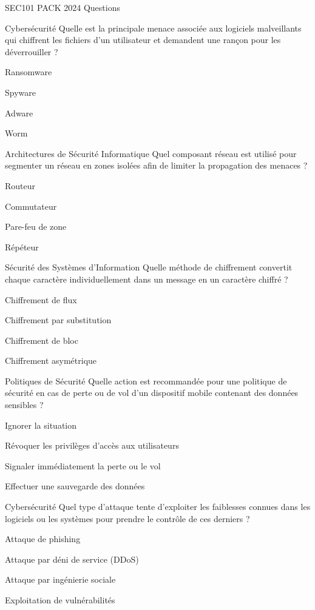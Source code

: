 \documentclass[12pt]{article}
\begin{document}
\begin{quiz}{SEC101 PACK 2024 Questions}
  \begin{multi}[points=1]{Cybersécurité}
    Quelle est la principale menace associée aux logiciels malveillants qui chiffrent les fichiers d'un utilisateur et demandent une rançon pour les déverrouiller ?
    \item* Ransomware
    \item Spyware
    \item Adware
    \item Worm
  \end{multi}

  \begin{multi}[points=1]{Architectures de Sécurité Informatique}
    Quel composant réseau est utilisé pour segmenter un réseau en zones isolées afin de limiter la propagation des menaces ?
    \item Routeur
    \item Commutateur
    \item* Pare-feu de zone
    \item Répéteur
  \end{multi}

  \begin{multi}[points=1]{Sécurité des Systèmes d'Information}
    Quelle méthode de chiffrement convertit chaque caractère individuellement dans un message en un caractère chiffré ?
    \item Chiffrement de flux
    \item* Chiffrement par substitution
    \item Chiffrement de bloc
    \item Chiffrement asymétrique
  \end{multi}

  \begin{multi}[points=1]{Politiques de Sécurité}
    Quelle action est recommandée pour une politique de sécurité en cas de perte ou de vol d'un dispositif mobile contenant des données sensibles ?
    \item Ignorer la situation
    \item Révoquer les privilèges d'accès aux utilisateurs
    \item* Signaler immédiatement la perte ou le vol
    \item Effectuer une sauvegarde des données
  \end{multi}

  \begin{multi}[points=1]{Cybersécurité}
    Quel type d'attaque tente d'exploiter les faiblesses connues dans les logiciels ou les systèmes pour prendre le contrôle de ces derniers ?
    \item Attaque de phishing
    \item Attaque par déni de service (DDoS)
    \item Attaque par ingénierie sociale
    \item* Exploitation de vulnérabilités
  \end{multi}


\end{quiz}
\end{document}
